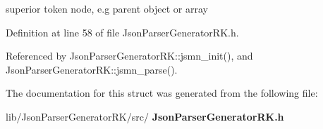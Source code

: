 superior token node, e.\+g parent object or array 



Definition at line 58 of file Json\+Parser\+Generator\+R\+K.\+h.



Referenced by Json\+Parser\+Generator\+R\+K\+::jsmn\+\_\+init(), and Json\+Parser\+Generator\+R\+K\+::jsmn\+\_\+parse().



The documentation for this struct was generated from the following file\+:\begin{DoxyCompactItemize}
\item 
lib/\+Json\+Parser\+Generator\+R\+K/src/\textbf{ Json\+Parser\+Generator\+R\+K.\+h}\end{DoxyCompactItemize}
